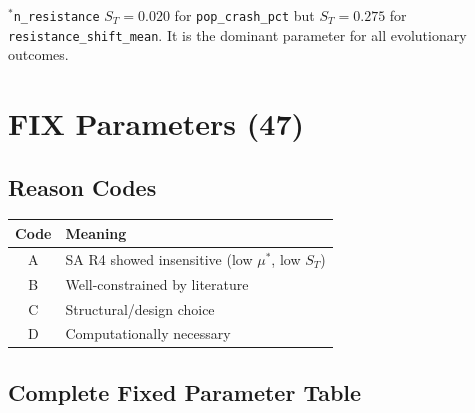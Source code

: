 \documentclass[11pt,a4paper]{article}
\begin{document}
\noindent $^*$\texttt{n\_resistance} $S_T = 0.020$ for \texttt{pop\_crash\_pct} but $S_T = 0.275$ for \texttt{resistance\_shift\_mean}. It is the dominant parameter for all evolutionary outcomes.

\section{FIX Parameters (47)}

\subsection{Reason Codes}

\begin{tabular}{cl}
\toprule
\textbf{Code} & \textbf{Meaning} \\
\midrule
A & SA R4 showed insensitive (low $\mu^*$, low $S_T$) \\
B & Well-constrained by literature \\
C & Structural/design choice \\
D & Computationally necessary \\
\bottomrule
\end{tabular}

\subsection{Complete Fixed Parameter Table}
\end{document}
